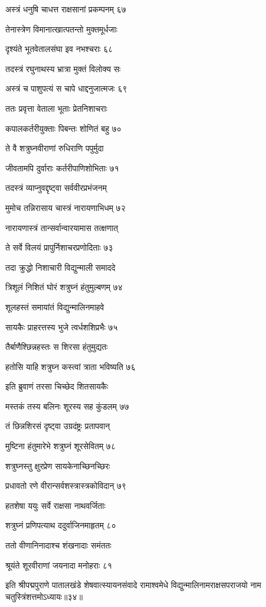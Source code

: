 अस्त्रं धनुषि चाधत्त राक्षसानां प्रकम्पनम् ६७

तेनास्त्रेण विमानात्खात्पतन्तो मुक्तमूर्धजाः

दृश्यंते भूतवेतालसंघा इव नभश्चराः ६८

तदस्त्रं रघुनाथस्य भ्रात्रा मुक्तं विलोक्य सः

अस्त्रं च पाशुपत्यं स चापे धाद्दनुजात्मजः ६९

ततः प्रवृत्ता वेताला भूताः प्रेतनिशाचराः

कपालकर्तरीयुक्ताः पिबन्तः शोणितं बहु ७०

ते वै शत्रुघ्नवीराणां रुधिराणि पपुर्मुदा

जीवतामपि दुर्वाराः कर्तरीपाणिशोभिताः ७१

तदस्त्रं व्याप्नुवद्दृष्ट्वा सर्ववीरप्रभंजनम्

मुमोच तन्निरासाय चास्त्रं नारायणाभिधम् ७२

नारायणास्त्रं तान्सर्वान्वारयामास तत्क्षणात्

ते सर्वे विलयं प्रापुर्निशाचरप्रणोदिताः ७३

तदा क्रुद्धो निशाचारी विद्युन्माली समाददे

त्रिशूलं निशितं घोरं शत्रुघ्नं हंतुमुल्बणम् ७४

शूलहस्तं समायांतं विद्युन्मालिनमाहवे

सायकैः प्राहरत्तस्य भुजे त्वर्धशशिप्रभैः ७५

तैर्बाणैश्छिन्नहस्तः स शिरसा हंतुमुद्यतः

हतोसि याहि शत्रुघ्न कस्त्वां त्राता भविष्यति ७६

इति ब्रुवाणं तरसा चिच्छेद शितसायकैः

मस्तकं तस्य बलिनः शूरस्य सह कुंडलम् ७७

तं छिन्नशिरसं दृष्ट्वा उग्रदंष्ट्रः प्रतापवान्

मुष्टिना हंतुमारेभे शत्रुघ्नं शूरसेवितम् ७८

शत्रुघ्नस्तु क्षुरप्रेण सायकेनाच्छिनच्छिरः

प्रधावतो रणे वीरान्सर्वशस्त्रास्त्रकोविदान् ७९

हतशेषा ययुः सर्वे राक्षसा नाथवर्जिताः

शत्रुघ्नं प्रणिपत्याथ ददुर्वाजिनमाहृतम् ८०

ततो वीणानिनादाश्च शंखनादाः समंततः

श्रूयंते शूरवीराणां जयनादा मनोहराः ८१

इति श्रीपद्मपुराणे पातालखंडे शेषवात्स्यायनसंवादे रामाश्वमेधे विद्युन्मालिनामराक्षसपराजयो नाम चतुस्त्रिंशत्तमोऽध्यायः॥३४॥


